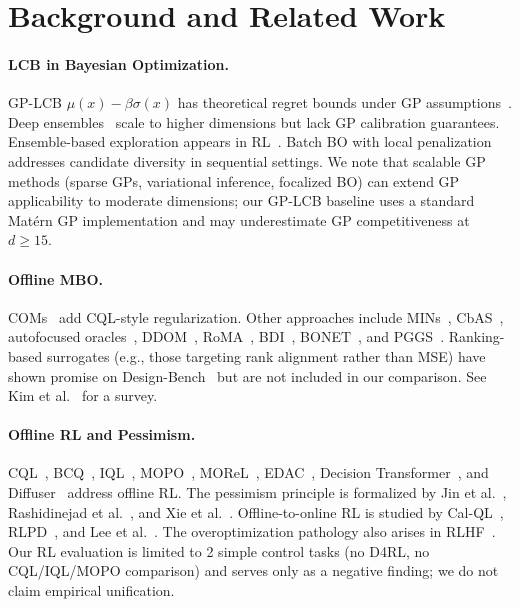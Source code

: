 \documentclass{article}
\theoremstyle{plain}
\theoremstyle{remark}
\begin{document}
\section{Background and Related Work}
\label{sec:background}

\paragraph{LCB in Bayesian Optimization.}
GP-LCB $\mu(x) - \beta\sigma(x)$ has theoretical regret bounds under GP assumptions~\cite{srinivas2010ucb}.
Deep ensembles~\cite{lakshminarayanan2017ensembles} scale to higher dimensions but lack GP calibration guarantees.
Ensemble-based exploration appears in RL~\cite{osband2016deep, an2021edac, lu2022revisiting}.
Batch BO with local penalization~\cite{gonzalez2016batch} addresses candidate diversity in sequential settings.
We note that scalable GP methods (sparse GPs, variational inference, focalized BO) can extend GP applicability to moderate dimensions; our GP-LCB baseline uses a standard Mat\'{e}rn GP implementation and may underestimate GP competitiveness at $d \geq 15$.

\paragraph{Offline MBO.}
COMs~\cite{trabucco2021coms} add CQL-style regularization.
Other approaches include MINs~\cite{kumar2020mins}, CbAS~\cite{brookes2019cbas}, autofocused oracles~\cite{fannjiang2020autofocused}, DDOM~\cite{krishnamoorthy2023ddom}, RoMA~\cite{yu2021roma}, BDI~\cite{chen2022bdi}, BONET~\cite{bonet2024}, and PGGS~\cite{chemingui2024pggs}.
Ranking-based surrogates (e.g., those targeting rank alignment rather than MSE) have shown promise on Design-Bench~\cite{tan2025ltr} but are not included in our comparison.
See Kim et al.\  for a survey.

\paragraph{Offline RL and Pessimism.}
CQL~\cite{kumar2020cql}, BCQ~\cite{fujimoto2019bcq}, IQL~\cite{kostrikov2022iql}, MOPO~\cite{yu2020mopo}, MOReL~\cite{kidambi2020morel}, EDAC~\cite{an2021edac}, Decision Transformer~\cite{chen2021dt}, and Diffuser~\cite{janner2022diffuser} address offline RL.
The pessimism principle is formalized by Jin et al.\ , Rashidinejad et al.\ , and Xie et al.\ .
Offline-to-online RL is studied by Cal-QL~\cite{nakamoto2023calql}, RLPD~\cite{ball2023rlpd}, and Lee et al.\ .
The overoptimization pathology also arises in RLHF~\cite{gao2022reward, rafailov2023dpo, chen2023importance}.
Our RL evaluation is limited to 2 simple control tasks (no D4RL, no CQL/IQL/MOPO comparison) and serves only as a negative finding; we do not claim empirical unification.
\end{document}
